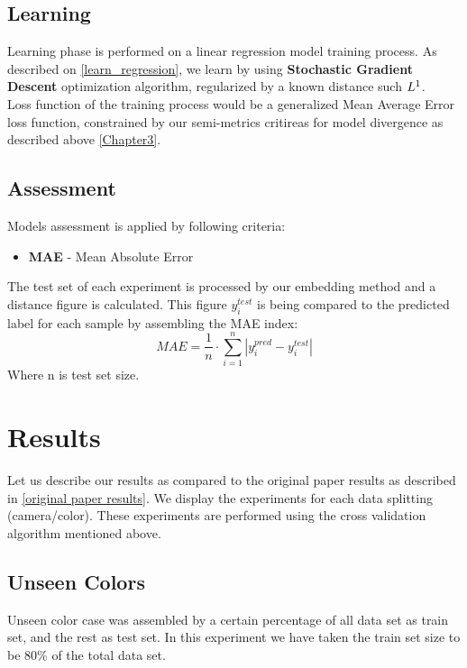 \subsection{Learning}
Learning phase is performed on a linear regression model training process.
As described on \ref{learn_regression}, we learn by using \textbf{Stochastic Gradient Descent} \cite{SGD} optimization algorithm, regularized by a known distance such $L^1$. \\
Loss function of the training process would be a generalized Mean Average Error \cite{MAE} loss function, constrained by our semi-metrics critireas for model divergence as described above \ref{Chapter3}.

\vskip30pt
\subsection{Assessment}
Models assessment is applied by following criteria:
\begin{itemize}
\item \textbf{MAE} - Mean Absolute Error
\end{itemize}

The test set of each experiment is processed by our embedding method and a  distance figure is calculated. This figure $y_i^{test}$ is being compared to the predicted label for each sample by assembling the MAE index:
\begin{equation}
MAE = \frac{1}{n} \cdot \sum_{i = 1}^{n}{|y^{pred}_i - y^{test}_i|}
\end{equation}
Where n is test set size. \\


\section{Results}

Let us describe our results as compared to the original paper results as described in \ref{original paper results}.
We display the experiments for each data splitting (camera/color). 
These experiments are performed using the cross validation algorithm mentioned above.


\subsection{Unseen Colors}

Unseen color case was assembled by a certain percentage of all data set as train set, and the rest as test set. In this experiment we have taken the train set size to be $80 \%$ of the total data set.

